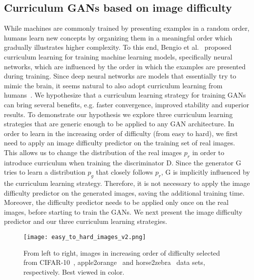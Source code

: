 \documentclass[10pt,twocolumn,letterpaper]{article}
\begin{document}
\vspace{-0.1cm}
\subsection{Curriculum GANs based on image difficulty}
\label{sec_Method_sub}
\vspace{-0.1cm}

While machines are commonly trained by presenting examples in a random order, humans learn new concepts by organizing them in a meaningful order which gradually illustrates higher complexity. To this end, Bengio et al.~\cite{Bengio-ICML-2009} proposed curriculum learning for training machine learning models, specifically neural networks, which are influenced by the order in which the examples are presented during training. Since deep neural networks are models that essentially try to mimic the brain, it seems natural to also adopt curriculum learning from humans~\cite{Smith-TCS-2018}. We hypothesize that a curriculum learning strategy for training GANs can bring several benefits, e.g. faster convergence, improved stability and superior results. To demonstrate our hypothesis we explore three curriculum learning strategies that are generic enough to be applied to any GAN architecture. In order to learn in the increasing order of difficulty (from easy to hard), we first need to apply an image difficulty predictor on the training set of real images. This allows us to change the distribution of the real images $p_r$ in order to introduce curriculum when training the discriminator D. Since the generator G tries to learn a distribution $p_g$ that closely follows $p_r$, G is implicitly influenced by the curriculum learning strategy. Therefore, it is not necessary to apply the image difficulty predictor on the generated images, saving the additional training time. Moreover, the difficulty predictor needs to be applied only once on the real images, before starting to train the GANs. We next present the image difficulty predictor and our three curriculum learning strategies.

\begin{figure}[!t]
\begin{center}
\texttt{[image: easy\_to\_hard\_images\_v2.png]}
\end{center}
\vspace*{-0.3cm}
\caption{From left to right, images in increasing order of difficulty selected from CIFAR-10~\cite{Krizhevsky-TR-2009}, apple2orange~\cite{Zhu-ICCV-2017} and horse2zebra~\cite{Zhu-ICCV-2017} data sets, respectively. Best viewed in color.}
\label{fig_easy_to_hard}
\vspace*{-0.4cm}
\end{figure}
\end{document}
